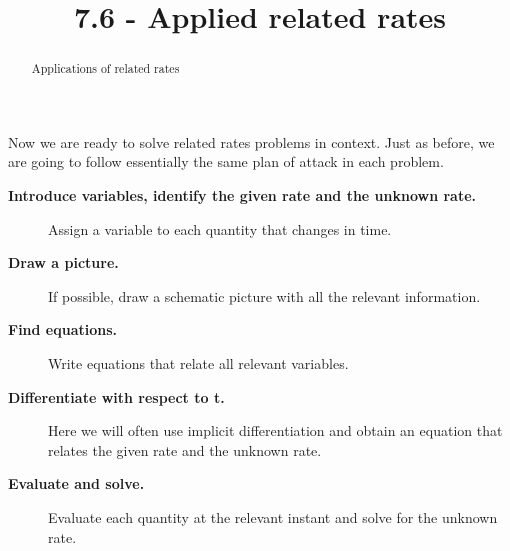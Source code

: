 \documentclass{ximera}
\title{7.6 - Applied related rates}
\begin{document}
\begin{abstract}
Applications of related rates
\end{abstract}
\maketitle
	
	Now we are ready to solve related rates problems in context. Just as
	before, we are going to follow essentially the same plan of attack in
	each problem.
	
	\begin{description}
		\item[\textbf{Introduce variables, identify the given rate and the unknown rate.}] Assign a variable to each quantity that changes in time.
		\item[\textbf{Draw a picture.}] If possible, draw a schematic picture with all the relevant information. 
		\item[\textbf{Find equations.}] Write equations that relate all
		relevant variables.
		\item[\textbf{Differentiate with respect to t.}] Here we will often use
		implicit differentiation and obtain an equation that relates the given rate and the unknown rate. 
		\item[\textbf{Evaluate and solve.}] Evaluate
		each quantity at the relevant instant and solve for the unknown rate.
		
	\end{description}
	
	
	
	
\end{document}
